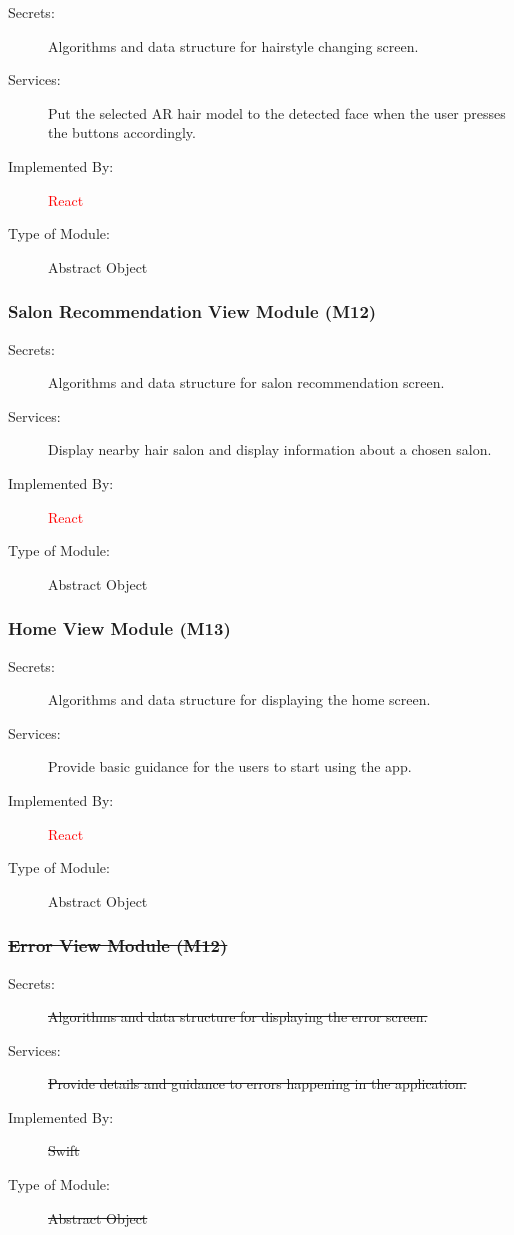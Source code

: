 \documentclass[12pt, titlepage]{article}
\begin{document}
\begin{description}
\item[Secrets:] Algorithms and data structure for hairstyle changing screen.
\item[Services:] Put the selected AR hair model to the detected face when the user presses the buttons accordingly.
\item[Implemented By:] \textcolor{red}{React}
\item[Type of Module:] Abstract Object
\end{description}

\subsubsection{Salon Recommendation View Module (M12)}

\begin{description}
\item[Secrets:] Algorithms and data structure for salon recommendation screen.
\item[Services:] Display nearby hair salon and display information about a chosen salon.
\item[Implemented By:] \textcolor{red}{React}
\item[Type of Module:] Abstract Object
\end{description}

\subsubsection{Home View Module (M13)}

\begin{description}
\item[Secrets:] Algorithms and data structure for displaying the home screen.
\item[Services:] Provide basic guidance for the users to start using the app.

\item[Implemented By:]\textcolor{red}{React}
\item[Type of Module:] Abstract Object
\end{description}

\subsubsection{\sout{Error View Module (M12)}}

\begin{description}
\item [Secrets:] \sout{Algorithms and data structure for displaying the error screen.}
\item[Services:] \sout{Provide details and guidance to errors happening in the application.}
\item[Implemented By:] \sout{Swift}
\item[Type of Module:] \sout{Abstract Object}
\end{description}
\end{document}

